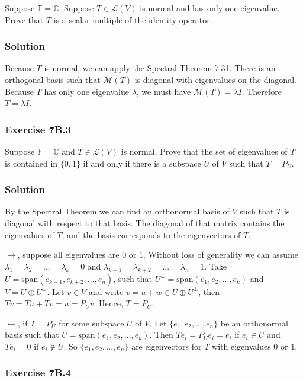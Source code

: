 Suppose $\mathbb{F} = \mathbb{C}$.
Suppose $T \in \mathcal{L}(V)$ is normal and has only one eigenvalue.
Prove that $T$ is a scalar multiple of the identity operator.

\subsubsection*{Solution}

Because $T$ is normal, we can apply the Spectral Theorem 7.31.
There is an orthogonal basis such that $\mathcal{M}(T)$ is diagonal with eigenvalues on the diagonal.
Because $T$ has only one eigenvalue $\lambda$, we must have $\mathcal{M}(T) = \lambda I$.
Therefore $T = \lambda I$.


\subsubsection*{Exercise 7B.3}

Suppose $\mathbb{F} = \mathbb{C}$ and $T \in \mathcal{L}(V)$ is normal.
Prove that the set of eigenvalues of $T$ is contained in $\{0, 1\}$ if and only if there is a subspace $U$ of $V$ such that $T = P_U$.

\subsubsection*{Solution}

By the Spectral Theorem we can find an orthonormal basis of $V$ such that $T$ is diagonal with respect to that basis.
The diagonal of that matrix contains the eigenvalues of $T$, and the basis corresponds to the eigenvectors of $T$.

$\rightarrow$, suppose all eigenvalues are $0$ or $1$.
Without loss of generality we can assume $\lambda_1 = \lambda_2 = ... = \lambda_k = 0$ and $\lambda_{k+1} = \lambda_{k+2} = ... = \lambda_n = 1$.
Take $U = \mathrm{span}(e_{k+1}, e_{k+2}, ..., e_n)$, such that $U^{\perp} = \mathrm{span}(e_1, e_2, ..., e_k)$ and $V = U \oplus U^{\perp}$.
Let $v \in V$ and write $v = u + w \in U \oplus U^{\perp}$, then $Tv = Tu + Tv = u = P_Uv$.
Hence, $T = P_U$.

$\leftarrow$, if $T = P_U$ for some subspace $U$ of $V$.
Let $\{e_1, e_2, ..., e_n\}$ be an orthonormal basis such that $U = \mathrm{span}(e_1, e_2, ..., e_k)$.
Then $Te_i = P_U e_i = e_i$ if $e_i \in U$ and $Te_i = 0$ if $e_i \notin U$.
So $\{e_1, e_2, ..., e_n\}$ are eigenvectors for $T$ with eigenvalues $0$ or $1$.


\subsubsection*{Exercise 7B.4}

